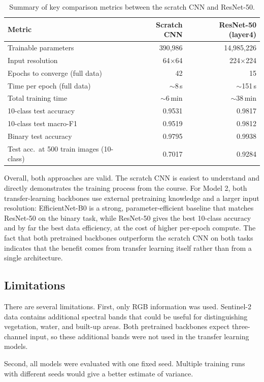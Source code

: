\begin{table}[H]
\centering
\caption{Summary of key comparison metrics between the scratch CNN and ResNet-50.}
\label{tab:comparison_summary}
\small
\begin{tabular}{lrr}
\toprule
Metric & Scratch CNN & ResNet-50 (layer4) \\
\midrule
Trainable parameters          & 390{,}986   & 14{,}985{,}226 \\
Input resolution              & 64$\times$64    & 224$\times$224     \\
Epochs to converge (full data)& 42          & 15                 \\
Time per epoch (full data)    & $\sim$8\,s  & $\sim$151\,s       \\
Total training time           & $\sim$6\,min & $\sim$38\,min     \\
10-class test accuracy        & 0.9531      & 0.9817             \\
10-class test macro-F1        & 0.9519      & 0.9812             \\
Binary test accuracy          & 0.9795      & 0.9938             \\
Test acc.\ at 500 train images (10-class) & 0.7017 & 0.9284      \\
\bottomrule
\end{tabular}
\end{table}

Overall, both approaches are valid. The scratch CNN is easiest to understand
and directly demonstrates the training process from the course. For Model 2,
both transfer-learning backbones use external pretraining knowledge and a larger
input resolution: EfficientNet-B0 is a strong, parameter-efficient baseline that
matches ResNet-50 on the binary task, while ResNet-50 gives the best 10-class
accuracy and by far the best data efficiency, at the cost of higher per-epoch
compute. The fact that both pretrained backbones outperform the scratch CNN on
both tasks indicates that the benefit comes from transfer learning itself rather
than from a single architecture.

\subsection{Limitations}

There are several limitations. First, only RGB information was used. Sentinel-2
data contains additional spectral bands that could be useful for distinguishing
vegetation, water, and built-up areas. Both pretrained backbones expect
three-channel input, so these additional bands were not used in the transfer
learning models.

Second, all models were evaluated with one fixed seed. Multiple training runs
with different seeds would give a better estimate of variance.
